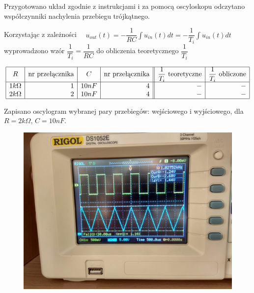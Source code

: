\documentclass[polish,polish,a4paper]{article}
\begin{document}
\begin{spacing}{1.3}
Przygotowano układ zgodnie z instrukcjami i za pomocą oscyloskopu odczytano współczynniki nachylenia przebiegu trójkątnego.

Korzystając z zależności $\quad u_{out}(t) = - \dfrac{1}{RC} \int u_{in}(t)dt = - \dfrac{1}{T_{i}} \int u_{in}(t)dt$ wyprowadzono wzór $\dfrac{1}{T_{i}} = \dfrac{1}{RC}$ do obliczenia teoretycznego $ \dfrac{1}{T_{i}}$
\begin{spacing}{2}
\begin{equation*}
\begin{array}{|r|r|r|r||r|r|}
\hline
\multicolumn{1}{|c|}{R}&\multicolumn{1}{c|}{$nr przełącznika$}&\multicolumn{1}{c|}{C}&\multicolumn{1}{c||}{$nr przełącznika$}&
\multicolumn{1}{c|}{\dfrac{1}{T_{i}}$ teoretyczne$}&\multicolumn{1}{c|}{\dfrac{1}{T_{i}}$ obliczone$}\\
\hline

1k\Omega&1&10nF&4&-&-\\
2k\Omega&2&10nF&4&-&-\\
\hline

\end{array}
\end{equation*}
\end{spacing}

Zapisano oscylogram wybranej pary przebiegów: wejściowego i wyjściowego, dla $R = 2k\Omega$, $C = 10nF$.

\begin{figure}[H]
	\centering
	\includegraphics[scale=0.1]{151.jpg}
\end{figure}



\end{spacing}
\end{document}
